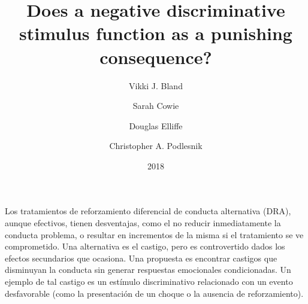 \documentclass[a4paper,12pt]{article}
\title{Does a negative discriminative stimulus function as a punishing consequence?}
\author{Vikki J. Bland \and Sarah Cowie \and Douglas Elliffe \and Christopher A. Podlesnik}
\date{2018}
\begin{document}
{\scshape\bfseries \maketitle}

Los tratamientos de reforzamiento diferencial de conducta alternativa (DRA), aunque efectivos, tienen desventajas, como el no reducir inmediatamente la conducta problema, o resultar en incrementos de la misma si el tratamiento se ve comprometido.
Una alternativa es el castigo, pero es controvertido dados los efectos secundarios que ocasiona.
Una propuesta es encontrar castigos que disminuyan la conducta sin generar respuestas emocionales condicionadas.
Un ejemplo de tal castigo es un estímulo discriminativo relacionado con un evento desfavorable (como la presentación de un choque o la ausencia de reforzamiento).
\end{document}

